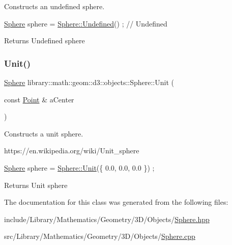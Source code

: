 Constructs an undefined sphere. 


\begin{DoxyCode}
\hyperlink{classlibrary_1_1math_1_1geom_1_1d3_1_1objects_1_1_sphere_a55dccc8ea16ee55cd7694c26afa8ea39}{Sphere} sphere = \hyperlink{classlibrary_1_1math_1_1geom_1_1d3_1_1objects_1_1_sphere_a777600f8814a2879e925909f30cfe9c4}{Sphere::Undefined}() ; \textcolor{comment}{// Undefined}
\end{DoxyCode}


\begin{DoxyReturn}{Returns}
Undefined sphere 
\end{DoxyReturn}
\mbox{\label{classlibrary_1_1math_1_1geom_1_1d3_1_1objects_1_1_sphere_a5464ea9145425db63dedbd896d6c97b0}} 
\subsubsection{\texorpdfstring{Unit()}{Unit()}}
{\footnotesize\ttfamily \hyperlink{classlibrary_1_1math_1_1geom_1_1d3_1_1objects_1_1_sphere}{Sphere} library\+::math\+::geom\+::d3\+::objects\+::\+Sphere\+::\+Unit (\begin{DoxyParamCaption}\item[{const \hyperlink{classlibrary_1_1math_1_1geom_1_1d3_1_1objects_1_1_point}{Point} \&}]{a\+Center }\end{DoxyParamCaption})\hspace{0.3cm}{\ttfamily [static]}}



Constructs a unit sphere. 

https\+://en.wikipedia.\+org/wiki/\+Unit\+\_\+sphere


\begin{DoxyCode}
\hyperlink{classlibrary_1_1math_1_1geom_1_1d3_1_1objects_1_1_sphere_a55dccc8ea16ee55cd7694c26afa8ea39}{Sphere} sphere = \hyperlink{classlibrary_1_1math_1_1geom_1_1d3_1_1objects_1_1_sphere_a5464ea9145425db63dedbd896d6c97b0}{Sphere::Unit}(\{ 0.0, 0.0, 0.0 \}) ;
\end{DoxyCode}


\begin{DoxyReturn}{Returns}
Unit sphere 
\end{DoxyReturn}


The documentation for this class was generated from the following files\+:\begin{DoxyCompactItemize}
\item 
include/\+Library/\+Mathematics/\+Geometry/3\+D/\+Objects/\hyperlink{_sphere_8hpp}{Sphere.\+hpp}\item 
src/\+Library/\+Mathematics/\+Geometry/3\+D/\+Objects/\hyperlink{_sphere_8cpp}{Sphere.\+cpp}\end{DoxyCompactItemize}
